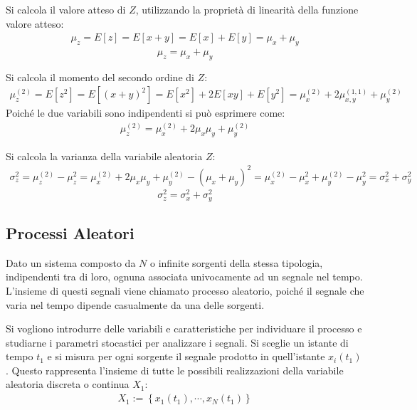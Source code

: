 \documentclass{article}
\numberwithin{equation}{subsection}
\begin{document}
Si calcola il valore atteso di $Z$, utilizzando la proprietà di linearità della funzione valore atteso:
\begin{gather*}
    \mu_z=E[z]=E[x+y]=E[x]+E[y]=\mu_x+\mu_y
\end{gather*}
\begin{equation}
    \mu_z=\mu_x+\mu_y
\end{equation}

Si calcola il momento del secondo ordine di $Z$:
\begin{gather*}
    \mu_z^{(2)}=E[z^2]=E[(x+y)^2]=E[x^2]+2E[xy]+E[y^2]=\mu_x^{(2)}+2\mu_{x,y}^{(1,1)}+\mu_y^{(2)}
\end{gather*}
Poiché le due variabili sono indipendenti si può esprimere come:
\begin{gather}
    \mu_z^{(2)}=\mu_x^{(2)}+2\mu_x\mu_y+\mu_y^{(2)}
\end{gather}

Si calcola la varianza della variabile aleatoria $Z$:
\begin{gather*}
    \sigma_z^2=\mu_z^{(2)}-\mu_z^2=\mu_x^{(2)}+2\mu_x\mu_y+\mu_y^{(2)}-(\mu_x+\mu_y)^2=\mu_x^{(2)}-\mu_x^2+\mu_y^{(2)}-\mu_y^2=\sigma_x^2+\sigma_y^2
\end{gather*}
\begin{equation}
    \sigma_z^2=\sigma_x^2+\sigma_y^2
\end{equation}

\subsection{Processi Aleatori}

Dato un sistema composto da $N$ o infinite sorgenti della stessa tipologia, indipendenti tra di loro, ognuna associata univocamente ad un segnale nel tempo. L'insieme di questi 
segnali viene chiamato processo aleatorio, poiché il segnale che varia nel tempo dipende casualmente da una delle sorgenti. 

Si vogliono introdurre delle variabili e caratteristiche per individuare il processo e studiarne i parametri stocastici per analizzare i segnali. 
Si sceglie un istante di tempo $t_1$ e si misura per ogni sorgente il segnale prodotto in quell'istante $x_i(t_1)$. Questo rappresenta l'insieme di tutte le possibili realizzazioni della variabile 
aleatoria discreta o continua $X_1$:
\begin{gather*}
    X_1:=\left\{x_1(t_1),\cdots,x_N(t_1)\right\}
\end{gather*}
\end{document}
